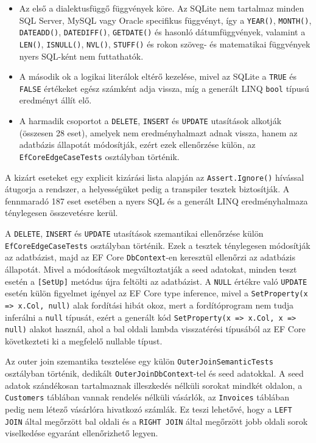 \documentclass[a4paper,12pt]{article}
\begin{document}
\begin{itemize}
\item Az első a dialektusfüggő függvények köre. Az SQLite nem tartalmaz minden SQL Server, MySQL vagy Oracle specifikus függvényt, így a \texttt{YEAR()}, \texttt{MONTH()}, \texttt{DATEADD()}, \texttt{DATEDIFF()}, \texttt{GETDATE()} és hasonló dátumfüggvények, valamint a \texttt{LEN()}, \texttt{ISNULL()}, \texttt{NVL()}, \texttt{STUFF()} és rokon szöveg- és matematikai függvények nyers SQL-ként nem futtathatók.
\item A második ok a logikai literálok eltérő kezelése, mivel az SQLite a \texttt{TRUE} és \texttt{FALSE} értékeket egész számként adja vissza, míg a generált LINQ \texttt{bool} típusú eredményt állít elő.
\item A harmadik csoportot a \texttt{DELETE}, \texttt{INSERT} és \texttt{UPDATE} utasítások alkotják (összesen 28 eset), amelyek nem eredményhalmazt adnak vissza, hanem az adatbázis állapotát módosítják, ezért ezek ellenőrzése külön, az \texttt{EfCoreEdgeCaseTests} osztályban történik.
\end{itemize}

A kizárt eseteket egy explicit kizárási lista alapján az \texttt{Assert.Ignore()} hívással átugorja a rendszer, a helyességüket pedig a transpiler tesztek biztosítják. A fennmaradó 187 eset esetében a nyers SQL és a generált LINQ eredményhalmaza ténylegesen összevetésre kerül.

A \texttt{DELETE}, \texttt{INSERT} és \texttt{UPDATE} utasítások szemantikai ellenőrzése külön \texttt{EfCoreEdgeCaseTests} osztályban történik. Ezek a tesztek ténylegesen módosítják az adatbázist, majd az EF Core \texttt{DbContext}-en keresztül ellenőrzi az adatbázis állapotát. Mivel a módosítások megváltoztatják a seed adatokat, minden teszt esetén a \texttt{[SetUp]} metódus újra feltölti az adatbázist. A \texttt{NULL} értékre való \texttt{UPDATE} esetén külön figyelmet igényel az EF Core type inference, mivel a \texttt{SetProperty(x => x.Col, null)} alak fordítási hibát okoz, mert a fordítóprogram nem tudja inferálni a \texttt{null} típusát, ezért a generált kód \texttt{SetProperty(x => x.Col, x => null)} alakot használ, ahol a bal oldali lambda visszatérési típusából az EF Core következteti ki a megfelelő nullable típust.

Az outer join szemantika tesztelése egy külön \texttt{OuterJoinSemanticTests} osztályban történik, dedikált \texttt{OuterJoinDbContext}-tel és seed adatokkal. A seed adatok szándékosan tartalmaznak illeszkedés nélküli sorokat mindkét oldalon, a \texttt{Customers} táblában vannak rendelés nélküli vásárlók, az \texttt{Invoices} táblában pedig nem létező vásárlóra hivatkozó számlák. Ez teszi lehetővé, hogy a \texttt{LEFT JOIN} által megőrzött bal oldali és a \texttt{RIGHT JOIN} által megőrzött jobb oldali sorok viselkedése egyaránt ellenőrizhető legyen.
\end{document}
